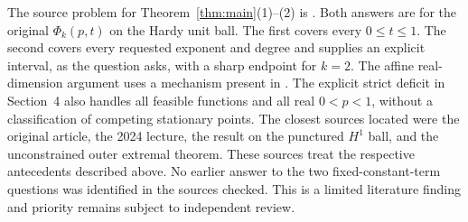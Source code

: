 \documentclass[11pt]{article}
\numberwithin{equation}{section}
\theoremstyle{remark}
\begin{document}
The source problem for Theorem~\ref{thm:main}(1)--(2) is
\cite[Section~6, Questions~1--2]{BGI}. Both answers are for the original
\(\Phi_k(p,t)\) on the Hardy unit ball. The first covers every
\(0\le t\le1\). The second covers every requested exponent and degree
and supplies an explicit interval, as the question asks, with a sharp
endpoint for \(k=2\).
The affine real-dimension argument uses a mechanism present in
\cite{dLR,Dyakonov,Sovik}. The explicit strict deficit in Section~4
also handles all feasible functions and all real \(0<p<1\), without
a classification of competing stationary points.
The closest sources located were the original article, the 2024
lecture, the result on the punctured \(H^1\) ball, and the unconstrained
outer extremal theorem. These sources treat the respective antecedents
described above. No earlier answer to the two fixed-constant-term
questions was identified in the sources checked. This is a limited
literature finding and priority remains subject to independent review.
\end{document}
